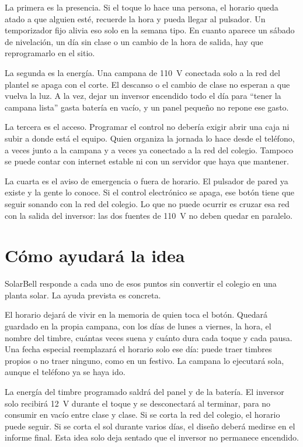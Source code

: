 \documentclass[12pt,letterpaper]{article}
\begin{document}
La primera es la presencia. Si el toque lo hace una persona, el horario queda atado a que alguien esté, recuerde la hora y pueda llegar al pulsador. Un temporizador fijo alivia eso solo en la semana tipo. En cuanto aparece un sábado de nivelación, un día sin clase o un cambio de la hora de salida, hay que reprogramarlo en el sitio.

La segunda es la energía. Una campana de 110~V conectada solo a la red del plantel se apaga con el corte. El descanso o el cambio de clase no esperan a que vuelva la luz. A la vez, dejar un inversor encendido todo el día para ``tener la campana lista'' gasta batería en vacío, y un panel pequeño no repone ese gasto.

La tercera es el acceso. Programar el control no debería exigir abrir una caja ni subir a donde está el equipo. Quien organiza la jornada lo hace desde el teléfono, a veces junto a la campana y a veces ya conectado a la red del colegio. Tampoco se puede contar con internet estable ni con un servidor que haya que mantener.

La cuarta es el aviso de emergencia o fuera de horario. El pulsador de pared ya existe y la gente lo conoce. Si el control electrónico se apaga, ese botón tiene que seguir sonando con la red del colegio. Lo que no puede ocurrir es cruzar esa red con la salida del inversor: las dos fuentes de 110~V no deben quedar en paralelo.

\section*{Cómo ayudará la idea}

SolarBell responde a cada uno de esos puntos sin convertir el colegio en una planta solar. La ayuda prevista es concreta.

El horario dejará de vivir en la memoria de quien toca el botón. Quedará guardado en la propia campana, con los días de lunes a viernes, la hora, el nombre del timbre, cuántas veces suena y cuánto dura cada toque y cada pausa. Una fecha especial reemplazará el horario solo ese día: puede traer timbres propios o no traer ninguno, como en un festivo. La campana lo ejecutará sola, aunque el teléfono ya se haya ido.

La energía del timbre programado saldrá del panel y de la batería. El inversor solo recibirá 12~V durante el toque y se desconectará al terminar, para no consumir en vacío entre clase y clase. Si se corta la red del colegio, el horario puede seguir. Si se corta el sol durante varios días, el diseño deberá medirse en el informe final. Esta idea solo deja sentado que el inversor no permanece encendido.
\end{document}
